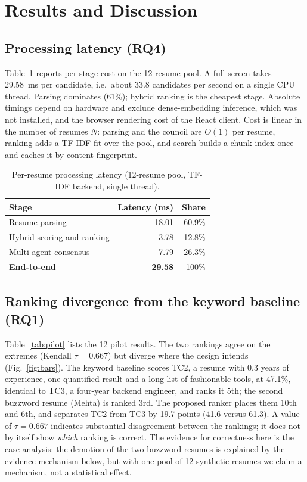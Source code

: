 \documentclass[conference]{IEEEtran}
\begin{document}
\section{Results and Discussion}

\subsection{Processing latency (RQ4)}
Table~\ref{tab:latency} reports per-stage cost on the 12-resume pool. A full screen takes 29.58~ms per candidate, i.e.\ about 33.8 candidates per second on a single CPU thread. Parsing dominates (61\%); hybrid ranking is the cheapest stage. Absolute timings depend on hardware and exclude dense-embedding inference, which was not installed, and the browser rendering cost of the React client. Cost is linear in the number of resumes $N$: parsing and the council are $O(1)$ per resume, ranking adds a TF-IDF fit over the pool, and search builds a chunk index once and caches it by content fingerprint.

\begin{table}[t]
\caption{Per-resume processing latency (12-resume pool, TF-IDF backend, single thread).}
\label{tab:latency}
\centering
\footnotesize
\begin{tabular}{@{}lrr@{}}
\toprule
Stage & Latency (ms) & Share \\
\midrule
Resume parsing & 18.01 & 60.9\% \\
Hybrid scoring and ranking & 3.78 & 12.8\% \\
Multi-agent consensus & 7.79 & 26.3\% \\
\midrule
\textbf{End-to-end} & \textbf{29.58} & 100\% \\
\bottomrule
\end{tabular}
\end{table}

\subsection{Ranking divergence from the keyword baseline (RQ1)}
Table~\ref{tab:pilot} lists the 12 pilot results. The two rankings agree on the extremes (Kendall $\tau=0.667$) but diverge where the design intends (Fig.~\ref{fig:bars}). The keyword baseline scores TC2, a resume with 0.3 years of experience, one quantified result and a long list of fashionable tools, at 47.1\%, identical to TC3, a four-year backend engineer, and ranks it 5th; the second buzzword resume (Mehta) is ranked 3rd. The proposed ranker places them 10th and 6th, and separates TC2 from TC3 by 19.7 points (41.6 versus 61.3). A value of $\tau=0.667$ indicates substantial disagreement between the rankings; it does not by itself show \emph{which} ranking is correct. The evidence for correctness here is the case analysis: the demotion of the two buzzword resumes is explained by the evidence mechanism below, but with one pool of 12 synthetic resumes we claim a mechanism, not a statistical effect.
\end{document}
